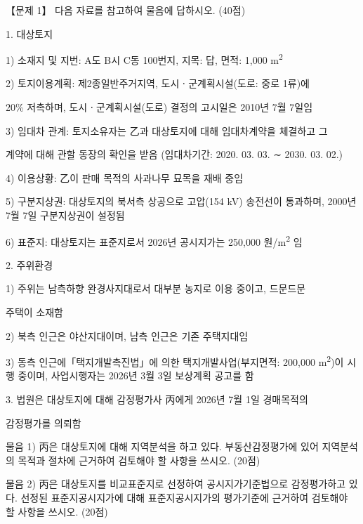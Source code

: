 \begin{longquestion}{【문제 1】}
다음 자료를 참고하여 물음에 답하시오. (40점) \par
\begin{framedtext}
1. 대상토지 \par
1) 소재지 및 지번: A도 B시 C동 100번지, 지목: 답, 면적: 1,000 m\textsuperscript{2} \par
2) 토지이용계획: 제2종일반주거지역, 도시ㆍ군계획시설(도로: 중로 1류)에 \par
20\% 저촉하며, 도시ㆍ군계획시설(도로) 결정의 고시일은 2010년 7월 7일임 \par
3) 임대차 관계: 토지소유자는 乙과 대상토지에 대해 임대차계약을 체결하고 그 \par
계약에 대해 관할 동장의 확인을 받음 (임대차기간: 2020. 03. 03. ∼ 2030. 03. 02.) \par
4) 이용상황: 乙이 판매 목적의 사과나무 묘목을 재배 중임 \par
5) 구분지상권: 대상토지의 북서측 상공으로 고압(154 kV) 송전선이 통과하며, 2000년 7월 7일 구분지상권이 설정됨 \par
6) 표준지: 대상토지는 표준지로서 2026년 공시지가는 250,000 원/m\textsuperscript{2} 임 \par
2. 주위환경 \par
1) 주위는 남측하향 완경사지대로서 대부분 농지로 이용 중이고, 드문드문 \par
주택이 소재함 \par
2) 북측 인근은 야산지대이며, 남측 인근은 기존 주택지대임 \par
3) 동측 인근에「택지개발촉진법」에 의한 택지개발사업(부지면적: 200,000 m\textsuperscript{2})이 시행 중이며, 사업시행자는 2026년 3월 3일 보상계획 공고를 함 \par
3. 법원은 대상토지에 대해 감정평가사 丙에게 2026년 7월 1일 경매목적의 \par
감정평가를 의뢰함 \par
\end{framedtext}
\medskip\noindent 물음 1) 丙은 대상토지에 대해 지역분석을 하고 있다. 부동산감정평가에 있어 지역분석의 목적과 절차에 근거하여 검토해야 할 사항을 쓰시오. (20점) \par
\medskip\noindent 물음 2) 丙은 대상토지를 비교표준지로 선정하여 공시지가기준법으로 감정평가하고 있다. 선정된 표준지공시지가에 대해 표준지공시지가의 평가기준에 근거하여 검토해야 할 사항을 쓰시오. (20점) \par
\end{longquestion}
